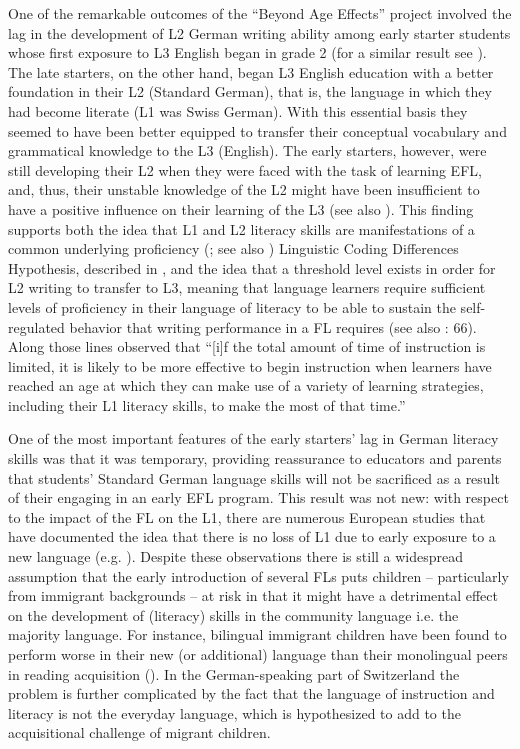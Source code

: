 \documentclass[output=paper,modfonts,nonflat,newtxmath]{langsci/langscibook}
\begin{document}
One of the remarkable outcomes of the “Beyond Age Effects” project involved the lag in the development of L2 German writing ability among early starter students whose first exposure to L3 English began in grade 2 (for a similar result see \citealt{Genesee2004}). The late starters, on the other hand, began L3 English education with a better foundation in their L2 (Standard German), that is, the language in which they had become literate (L1 was Swiss German). With this essential basis they seemed to have been better equipped to transfer their conceptual vocabulary and grammatical knowledge to the L3 (English). The early starters, however, were still developing their L2 when they were faced with the task of learning EFL, and, thus, their unstable knowledge of the L2 might have been insufficient to have a positive influence on their learning of the L3 (see also \citealt{Sánchez2012, Sánchez2015}). This finding supports both the idea that L1 and L2 literacy skills are manifestations of a common underlying proficiency (\citealt{Cummins1976, Cummins1981}; see also ) Linguistic Coding Differences Hypothesis, described in \citet{Sparks2012}, and the idea that  a threshold level exists in order for L2 writing to transfer to L3, meaning that language learners require sufficient levels of proficiency in their language of literacy to be able to sustain the self-regulated behavior that writing performance in a FL requires (see also \citealt{SchoonenEtAl2011}: 66). Along those lines \citet[449]{Lightbown2000} observed that “[i]f the total amount of time of instruction is limited, it is likely to be more effective to begin instruction when learners have reached an age at which they can make use of a variety of learning strategies, including their L1 literacy skills, to make the most of that time.”

One of the most important features of the early starters’ lag in German literacy skills was that it was temporary, providing reassurance to educators and parents that students’ Standard German language skills will not be sacrificed as a result of their engaging in an early EFL program. This result was not new: with respect to the impact of the FL on the L1, there are numerous European studies that have documented the idea that there is no loss of L1 due to early exposure to a new language (e.g. \citealt{Goorhuis-BrouwerDeBot2010}). Despite these observations there is still a widespread assumption that the early introduction of several FLs puts children – particularly from immigrant backgrounds – at risk in that it might have a detrimental effect on the development of (literacy) skills in the community language i.e. the majority language. For instance, bilingual immigrant children have been found to perform worse in their new (or additional) language than their monolingual peers in reading acquisition (\citealt{AugustHakuta1997, SlavinCheung2003}). In the German-speaking part of Switzerland the problem is further complicated by the fact that the language of instruction and literacy is not the everyday language, which is hypothesized to add to the acquisitional challenge of migrant children.
\end{document}
